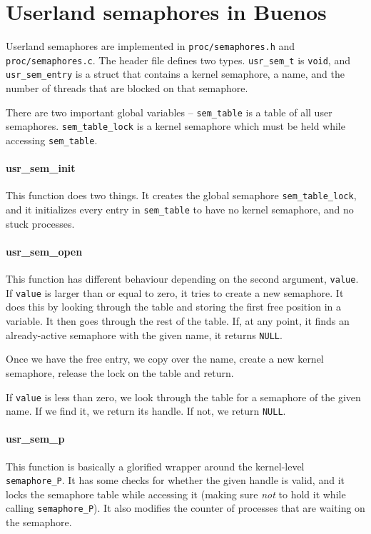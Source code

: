\documentclass{article}
\begin{document}
\section{Userland semaphores in Buenos}

Userland semaphores are implemented in \texttt{proc/semaphores.h} and \texttt{proc/semaphores.c}. The header file defines two types. \texttt{usr\_sem\_t} is \texttt{void}, and \texttt{usr\_sem\_entry} is a struct that contains a kernel semaphore, a name, and the number of threads that are blocked on that semaphore.

There are two important global variables -- \texttt{sem\_table} is a table of all user semaphores. \texttt{sem\_table\_lock} is a kernel semaphore which must be held while accessing \texttt{sem\_table}.

\paragraph{usr\_sem\_init}
This function does two things. It creates the global semaphore \texttt{sem\_table\_lock}, and it initializes every entry in \texttt{sem\_table} to have no kernel semaphore, and no stuck processes.

\paragraph{usr\_sem\_open}
This function has different behaviour depending on the second argument, \texttt{value}. If \texttt{value} is larger than or equal to zero, it tries to create a new semaphore. It does this by looking through the table and storing the first free position in a variable. It then goes through the rest of the table. If, at any point, it finds an already-active semaphore with the given name, it returns \texttt{NULL}.

Once we have the free entry, we copy over the name, create a new kernel semaphore, release the lock on the table and return.

If \texttt{value} is less than zero, we look through the table for a semaphore of the given name. If we find it, we return its handle. If not, we return \texttt{NULL}.

\paragraph{usr\_sem\_p}
This function is basically a glorified wrapper around the kernel-level \texttt{semaphore\_P}. It has some checks for whether the given handle is valid, and it locks the semaphore table while accessing it (making sure \emph{not} to hold it while calling \texttt{semaphore\_P}). It also modifies the counter of processes that are waiting on the semaphore.
\end{document}
